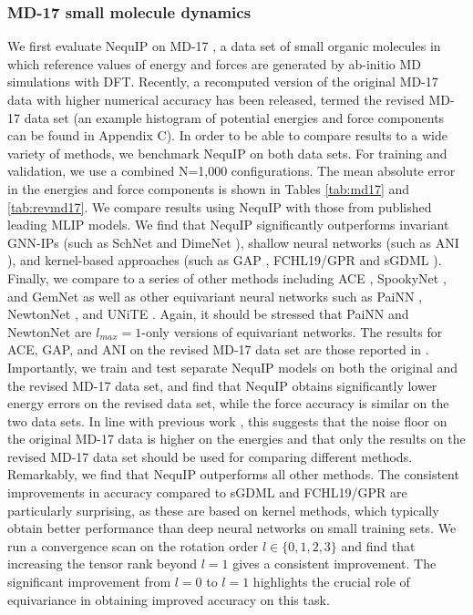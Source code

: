 \documentclass[11pt]{article}
\begin{document}
\subsubsection{MD-17 small molecule dynamics}
We first evaluate NequIP on MD-17 \cite{chmiela2017machine, schutt2017quantum, sgdml}, a data set of small organic molecules in which reference values of energy and forces are generated by ab-initio MD simulations with DFT. Recently, a recomputed version of the original MD-17 data with higher numerical accuracy has been released, termed the revised MD-17 data set \cite{christensen2020role} (an example histogram of potential energies and force components can be found in Appendix C). In order to be able to compare results to a wide variety of methods, we benchmark NequIP on both data sets. For training and validation, we use a combined N=1,000 configurations. The mean absolute error in the energies and force components is shown in Tables \ref{tab:md17} and \ref{tab:revmd17}. We compare results using NequIP with those from published leading MLIP models. We find that NequIP significantly outperforms invariant GNN-IPs (such as SchNet \cite{schnet_neurips} and DimeNet \cite{klicpera2020directional}), shallow neural networks (such as ANI \cite{devereux2020extending}), and kernel-based approaches (such as GAP \cite{gaporiginalpaper}, FCHL19/GPR \cite{christensen2020fchl, christensen2020role} and sGDML \cite{sgdml}). Finally, we compare to a series of other methods including ACE \cite{drautz2019atomic}, SpookyNet \cite{unke2021}, and GemNet \cite{klicpera2021gemnet} as well as other equivariant neural networks such as PaiNN \cite{schutt2021equivariant}, NewtonNet \cite{haghighatlari2021newtonnet}, and UNiTE \cite{qiao2021unite}. Again, it should be stressed that PaiNN and NewtonNet are $l_{max}=1$-only versions of equivariant networks. The results for ACE, GAP, and ANI on the revised MD-17 data set are those reported in \cite{kovacs2021linear}. Importantly, we train and test separate NequIP models on both the original and the revised MD-17 data set, and find that NequIP obtains significantly lower energy errors on the revised data set, while the force accuracy is similar on the two data sets. In line with previous work \cite{christensen2020role}, this suggests that the noise floor on the original MD-17 data is higher on the energies and that only the results on the revised MD-17 data set should be used for comparing different methods.\\

Remarkably, we find that NequIP outperforms all other methods. The consistent improvements in accuracy compared to sGDML and FCHL19/GPR are particularly surprising, as these are based on kernel methods, which typically obtain better performance than deep neural networks on small training sets. We run a convergence scan on the rotation order $l \in \{0, 1, 2, 3\}$ and find that increasing the tensor rank beyond $l=1$ gives a consistent improvement. The significant improvement from $l=0$ to $l=1$ highlights the crucial role of equivariance in obtaining improved accuracy on this task. 
\end{document}
